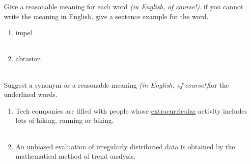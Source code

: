 \documentclass{exam}
\begin{document}
\begin{questions}
\question Give a reasonable meaning for each word \emph{(in English, of course!)}. if you cannot write the meaning in English, give a sentence example for the word.\\
\begin{enumerate}
	\item impel \\ \\
	\item abrasion \\ \\
\end{enumerate}
\question Suggest a synonym or a reasonable meaning \emph{(in English, of course!)}for the underlined words.\\
\begin{enumerate}
	\item Tech companies are filled with people whose \underline{extracurricular} activity includes lots of hiking, running or biking.\\ \\
	\item An \underline{unbiased} evaluation of irregularly distributed data is obtained by the mathematical method of trend analysis.\\ \\
\end{enumerate}

\end{questions}
\end{document}

